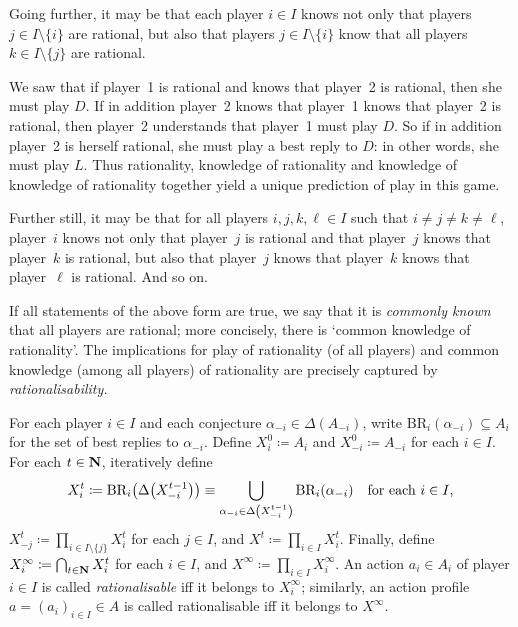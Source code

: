 Going further, it may be that each player $i \in I$ knows not only that players $j \in I \setminus \{i\}$ are rational, but also that players $j \in I \setminus \{i\}$ know that all players $k \in I \setminus \{j\}$ are rational.

\addtocounter{example}{-2}
\begin{example}[continued]
	\label{example:rbty_neverbest_rbty1}
	We saw that if player~1 is rational and knows that player~2 is rational, then she must play $D$. If in addition player~2 knows that player~1 knows that player~2 is rational, then player~2 understands that player~1 must play $D$. So if in addition player~2 is herself rational, she must play a best reply to $D$: in other words, she must play $L$. Thus rationality, knowledge of rationality and knowledge of knowledge of rationality together yield a unique prediction of play in this game.
\end{example}
\addtocounter{example}{1}

Further still, it may be that for all players $i,j,k,\ell \in I$ such that $i \neq j \neq k \neq \ell$, player~$i$ knows not only that player~$j$ is rational and that player~$j$ knows that player~$k$ is rational, but also that player~$j$ knows that player~$k$ knows that player~$\ell$ is rational. And so on.

If all statements of the above form are true, we say that it is \emph{commonly known} that all players are rational; more concisely, there is `common knowledge of rationality'. The implications for play of rationality (of all players) and common knowledge (among all players) of rationality are precisely captured by \emph{rationalisability.}

\begin{definition}
	\label{definition:rbty}
	For each player $i \in I$ and each conjecture $\alpha_{-i} \in \Delta(A_{-i})$, write $\text{BR}_i(\alpha_{-i}) \subseteq A_i$ for the set of best replies to $\alpha_{-i}$.
	Define $X^0_i \coloneqq A_i$ and $X^0_{-i} \coloneqq A_{-i}$ for each $i \in I$.
	For each $t \in \mathbf{N}$, iteratively define
	\begin{equation*}
		X^t_i \coloneqq \text{BR}_i\left( \Delta\left( X^{t-1}_{-i} \right) \right)
		\equiv \Union_{\alpha_{-i} \in \Delta\left( X^{t-1}_{-i} \right)} \text{BR}_i(\alpha_{-i})
		\quad \text{for each $i \in I$,}
	\end{equation*}
	$X^t_{-j} \coloneqq \prod_{i \in I \setminus \{j\}} X^t_i$ for each $j \in I$, and $X^t \coloneqq \prod_{i \in I} X^t_i$.
	Finally, define $X^\infty_i \coloneqq \bigcap_{t \in \mathbf{N}} X^t_i$ for each $i \in I$, and $X^\infty \coloneqq \prod_{i \in I} X^\infty_i$. An action $a_i \in A_i$ of player $i \in I$ is called \emph{rationalisable} iff it belongs to $X^\infty_i$; similarly, an action profile $a = (a_i)_{i \in I} \in A$ is called rationalisable iff it belongs to $X^\infty$.
\end{definition}

